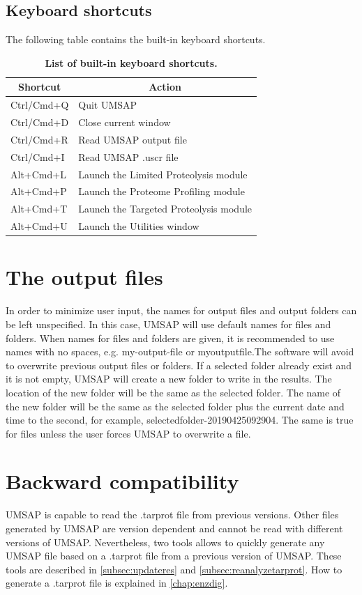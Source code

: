 \subsection{Keyboard shortcuts}

The following table contains the built-in keyboard shortcuts.

\begin{table}[h!]
	\centering
	\begin{tabular}{l l}
		\hline
		\multicolumn{1}{c}{Shortcut} & \multicolumn{1}{c}{Action} \\
		\hline
		Ctrl/Cmd+Q & Quit UMSAP                \\
		Ctrl/Cmd+D & Close current window \\
		Ctrl/Cmd+R & Read UMSAP output file \\
		Ctrl/Cmd+I  & Read UMSAP .uscr file  \\		
		Alt+Cmd+L & Launch the Limited Proteolysis module \\
		Alt+Cmd+P & Launch the Proteome Profiling module \\
		Alt+Cmd+T & Launch the Targeted Proteolysis module \\
		Alt+Cmd+U & Launch the Utilities window \\		
		\hline		
	\end{tabular}
	\caption[List of built-in keyboard shortcuts]{\textbf{List of built-in keyboard shortcuts.}}
	\label{table:shortcuts}
\end{table}



\section{The output files}

In order to minimize user input, the names for output files and output folders can be left unspecified. In this case, UMSAP will use default names for files and folders. When names for files and folders are given, it is recommended to use names with no spaces, e.g. my-output-file or myoutputfile.The software will avoid to overwrite previous output files or folders. If a selected folder already exist and it is not empty, UMSAP will create a new folder to write in the results. The location of the new folder will be the same as the selected folder. The name of the new folder will be the same as the selected folder plus the current date and time to the second, for example, selectedfolder-20190425092904. The same is true for files unless the user forces UMSAP to overwrite a file. 

\section{Backward compatibility}
\label{sec:backcomp}

UMSAP is capable to read the .tarprot file from previous versions. Other files generated by UMSAP are version dependent and cannot be read with different versions of UMSAP. Nevertheless, two tools allows to quickly generate any UMSAP file based on a .tarprot file from a previous version of UMSAP. These tools are described in \autoref{subsec:updateres} and \autoref{subsec:reanalyzetarprot}. How to generate a .tarprot file is explained in \autoref{chap:enzdig}.